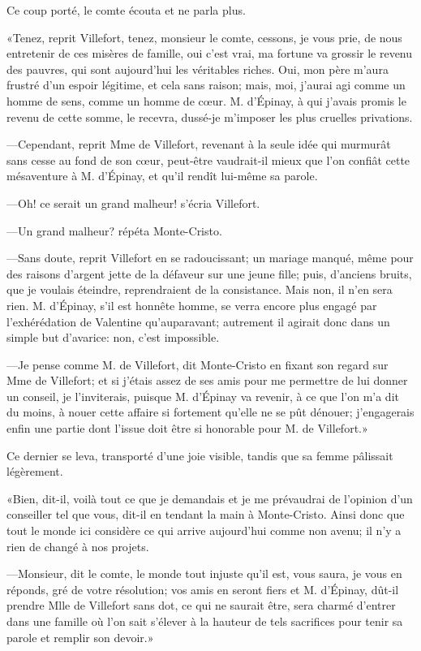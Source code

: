 Ce coup porté, le comte écouta et ne parla plus. 

«Tenez, reprit Villefort, tenez, monsieur le comte, cessons, je vous prie, de nous entretenir de ces misères de famille, oui c'est vrai, ma fortune va grossir le revenu des pauvres, qui sont aujourd'hui les véritables riches. Oui, mon père m'aura frustré d'un espoir légitime, et cela sans raison; mais, moi, j'aurai agi comme un homme de sens, comme un homme de cœur. M. d'Épinay, à qui j'avais promis le revenu de cette somme, le recevra, dussé-je m'imposer les plus cruelles privations. 

—Cependant, reprit Mme de Villefort, revenant à la seule idée qui murmurât sans cesse au fond de son cœur, peut-être vaudrait-il mieux que l'on confiât cette mésaventure à M. d'Épinay, et qu'il rendît lui-même sa parole. 

—Oh! ce serait un grand malheur! s'écria Villefort. 

—Un grand malheur? répéta Monte-Cristo. 

—Sans doute, reprit Villefort en se radoucissant; un mariage manqué, même pour des raisons d'argent jette de la défaveur sur une jeune fille; puis, d'anciens bruits, que je voulais éteindre, reprendraient de la consistance. Mais non, il n'en sera rien. M. d'Épinay, s'il est honnête homme, se verra encore plus engagé par l'exhérédation de Valentine qu'auparavant; autrement il agirait donc dans un simple but d'avarice: non, c'est impossible. 

—Je pense comme M. de Villefort, dit Monte-Cristo en fixant son regard sur Mme de Villefort; et si j'étais assez de ses amis pour me permettre de lui donner un conseil, je l'inviterais, puisque M. d'Épinay va revenir, à ce que l'on m'a dit du moins, à nouer cette affaire si fortement qu'elle ne se pût dénouer; j'engagerais enfin une partie dont l'issue doit être si honorable pour M. de Villefort.» 

Ce dernier se leva, transporté d'une joie visible, tandis que sa femme pâlissait légèrement. 

«Bien, dit-il, voilà tout ce que je demandais et je me prévaudrai de l'opinion d'un conseiller tel que vous, dit-il en tendant la main à Monte-Cristo. Ainsi donc que tout le monde ici considère ce qui arrive aujourd'hui comme non avenu; il n'y a rien de changé à nos projets.  

—Monsieur, dit le comte, le monde tout injuste qu'il est, vous saura, je vous en réponds, gré de votre résolution; vos amis en seront fiers et M. d'Épinay, dût-il prendre Mlle de Villefort sans dot, ce qui ne saurait être, sera charmé d'entrer dans une famille où l'on sait s'élever à la hauteur de tels sacrifices pour tenir sa parole et remplir son devoir.» 

